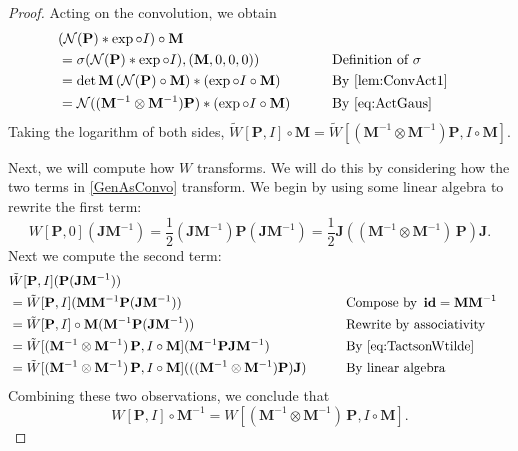 \documentclass[12pt]{article}
\theoremstyle{definition}
\theoremstyle{plain}
\newcommand{\id}{\mathop{\mathbf{id}}\nolimits}
\begin{document}
\begin{proof}
  Acting on the convolution, we obtain
  \begin{alignat}{3}
    &(\mathcal{N}(\mathbf{P}) * \exp \circ I) \circ \mathbf{M} \\
    &= \sigma(\mathcal{N}(\mathbf{P})*\exp\circ I),(\mathbf{M},0,0,0)) &&\text{Definition of }\sigma\\
    &= \det \mathbf{M} \,
    (\mathcal{N}(\mathbf{P}) \circ \mathbf{M})
    * (\exp \circ I \circ \mathbf{M}) &&\text{By \autoref{lem:ConvAct1}}\\
    &= \mathcal{N}((\mathbf{M}^{-1}\otimes\mathbf{M}^{-1}) \mathbf{P})
    * (\exp \circ I \circ \mathbf{M})\qquad &&\text{By \autoref{eq:ActGaus}}
  \end{alignat}
  Taking the logarithm of both sides, \(\tilde{W} [\mathbf{P}, I]
  \circ \mathbf{M} = \tilde{W} [(\mathbf{M}^{-1}\otimes\mathbf{M}^{-1}) \mathbf{P}, I \circ \mathbf{M}]\).

    Next, we will compute how \(W\) transforms.  We will do this by considering how the two terms in \autoref{GenAsConvo} transform.  We begin by using some linear algebra to rewrite the first term:
  \begin{equation}
   W[\mathbf{P},0](\mathbf{JM}^{-1})=\frac{1}{2}(\mathbf{J}\mathbf{M}^{-1})
   \mathbf{P} (\mathbf{J}\mathbf{M}^{-1})
   =\frac{1}{2}\mathbf{J} ((\mathbf{M}^{-1}\otimes\mathbf{M}^{-1})
   \, \mathbf{P})  \mathbf{J}.
 \end{equation}
 Next we compute the second term:
 \begin{alignat}{3}
   &\tilde{W}[\mathbf{P}, I](\mathbf{P}(\mathbf{J}\mathbf{M}^{-1}) )\\
   &= \tilde{W}[\mathbf{P}, I] (\mathbf{M} \mathbf{M}^{-1}
   \mathbf{P}(\mathbf{J}\mathbf{M}^{-1})) &&\text{Compose by }\id=\mathbf{MM}^{-1} \\
   &= \tilde{W}[\mathbf{P},I]\circ \mathbf{M}(\mathbf{M}^{-1}\mathbf{P}(\mathbf{JM}^{-1}))&&\text{Rewrite by associativity}\\
   &= \tilde{W}[(\mathbf{M}^{-1}\otimes\mathbf{M}^{-1})
   \, \mathbf{P} ,
     I \circ \mathbf{M}] (\mathbf{M}^{-1}
   \mathbf{P}\mathbf{J} \mathbf{M}^{-1} ) &&\text{By \autoref{eq:TactsonWtilde}}\\
   &=\tilde{W}[(\mathbf{M}^{-1}\otimes\mathbf{M}^{-1})\, \mathbf{P} , I \circ \mathbf{M}](((\mathbf{M}^{-1}\otimes\mathbf{M}^{-1})\mathbf{P})\mathbf{J}) \qquad&&\text{By linear algebra}
 \end{alignat}
 Combining these two observations, we conclude that
 \begin{equation}
    W [\mathbf{P}, I]
   \circ \mathbf{M}^{-1} = W [(\mathbf{M}^{-1}\otimes\mathbf{M}^{-1})
   \, \mathbf{P}, I \circ \mathbf{M}].
 \end{equation}
\end{proof}
\end{document}
